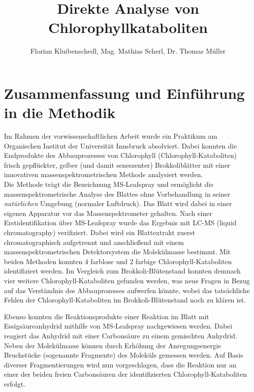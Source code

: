 \documentclass[12pt,a4paper]{article}
\author{Florian Kluibenschedl, Mag. Mathias Scherl, Dr. Thomas Müller}
\title{Direkte Analyse von Chlorophyllkataboliten}
\begin{document}
\maketitle

\section{Zusammenfassung und Einführung in die Methodik}
  Im Rahmen der vorwissenschaftlichen Arbeit wurde ein Praktikum am Organischen Institut der Universität Innsbruck absolviert. Dabei konnten die Endprodukte des Abbauprozesses von Chlorophyll (Chlorophyll-Kataboliten) frisch gepflückter, gelber (und damit seneszenter) Brokkoliblätter mit einer innovativen massenspektrometrischen Methode analysiert werden.\\

Die Methode trägt die Bezeichnung MS-Leafspray und ermöglicht die massenspektrometrische Analyse des Blattes ohne Vorbehandlung in seiner \textit{natürlichen} Umgebung (normaler Luftdruck). \cite{AmbientIonisation} \cite{PaperSpray} Das Blatt wird dabei in einer eigenen Apparatur vor das Massenspektrometer gehalten. Nach einer Erstidentifikation über MS-Leafspray wurde das Ergebnis mit LC-MS (liquid chromatography) verifiziert. Dabei wird ein Blattextrakt zuerst chromatographisch aufgetrennt und anschließend mit einem massenspektrometrischen Detektorsystem die Molekülmasse bestimmt. Mit beiden Methoden konnten 4 farblose und 2 farbige Chlorophyll-Kataboliten identifiziert werden. Im Vergleich zum Brokkoli-Blütenstand konnten demnach vier weitere Chlorophyll-Kataboliten gefunden werden, was neue Fragen in Bezug auf das Verständnis des Abbauprozesses aufwerfen könnte, wobei das tatsächliche Fehlen der Chlorophyll-Kataboliten im Brokkoli-Blütenstand noch zu klären ist.

Ebenso konnten die Reaktionsprodukte einer Reaktion im Blatt mit Essigsäureanhydrid mithilfe von MS-Leafspray nachgewiesen werden. Dabei reagiert das Anhydrid mit einer Carbonsäure zu einem gemischten Anhydrid. Neben der Molekülmasse können durch Erhöhung der Anregungsenergie Bruchstücke (sogenannte Fragmente) des Moleküls gemessen werden. Auf Basis diverser Fragmentierungen wird nun vorgeschlagen, dass die Reaktion nur an einer der beiden freien Carbonsäuren der identifizierten Chlorophyll-Kataboliten erfolgt. 

\end{document}
